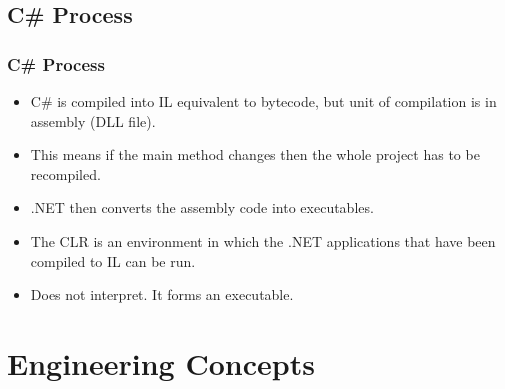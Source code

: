 \documentclass{beamer}
\begin{document}
\subsection{C\# Process}
\begin{frame}
\frametitle{C\# Process}
\begin{itemize}
\item C\# is compiled into {\color{red} IL} equivalent to bytecode, but unit of compilation is in {\color{green} assembly (DLL file)}.
\item This means if the main method changes then the whole project has to be recompiled.
\item {\color{purple} .NET} then converts the assembly code into executables.
\item The {\color{orange} CLR} is an environment in which the {\color{purple} .NET} applications that have been compiled to {\color{red} IL} can be run. 
\item Does not interpret. It forms an {\color{magenta}executable}.
\end{itemize}
\end{frame}
\section{Engineering Concepts}
\end{document}
